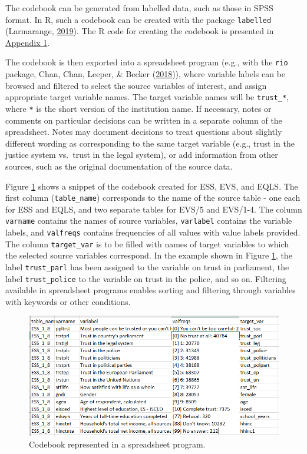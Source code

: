 \documentclass[12pt,]{article}
\begin{document}
The codebook can be generated from labelled data, such as those in SPSS format. In R, such a codebook can be created with the package \texttt{labelled} (Larmarange, \protect\hyperlink{ref-labelled}{2019}). The R code for creating the codebook is presented in \protect\hyperlink{appendix1}{Appendix 1}.

The codebook is then exported into a spreadsheet program (e.g., with the \texttt{rio} package, Chan, Chan, Leeper, \& Becker (\protect\hyperlink{ref-rio}{2018})), where variable labels can be browsed and filtered to select the source variables of interest, and assign appropriate target variable names. The target variable names will be \texttt{trust\_*}, where \texttt{*} is the short version of the institution name. If necessary, notes or comments on particular decisions can be written in a separate column of the spreadsheet. Notes may document decisions to treat questions about slightly different wording as corresponding to the same target variable (e.g., trust in the justice system vs.~trust in the legal system), or add information from other sources, such as the original documentation of the source data.

Figure \ref{fig:codebook} shows a snippet of the codebook created for ESS, EVS, and EQLS. The first column (\texttt{table\_name}) corresponds to the name of the source table - one each for ESS and EQLS, and two separate tables for EVS/5 and EVS/1-4. The column \texttt{varname} contains the names of source variables, \texttt{varlabel} contains the variable labels, and \texttt{valfreqs} contains frequencies of all values with value labels provided. The column \texttt{target\_var} is to be filled with names of target variables to which the selected source variables correspond. In the example shown in Figure \ref{fig:codebook}, the label \texttt{trust\_parl} has been assigned to the variable on trust in parliament, the label \texttt{trust\_police} to the variable on trust in the police, and so on. Filtering available in spreadsheet programs enables sorting and filtering through variables with keywords or other conditions.

\begin{figure}[H]
\includegraphics[width=465px]{../pictures/codebook_full} \caption{Codebook represented in a spreadsheet program.}\label{fig:codebook}
\end{figure}
\end{document}
